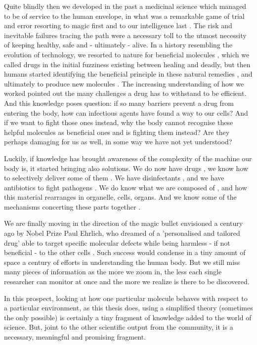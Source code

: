 Quite blindly then we developed in the past a medicinal science which managed to be of service to the human envelope, in what was a remarkable game of trial and error resorting to magic first and to our intelligence last \cite{history_medicine_review}. The risk and inevitable failures tracing the path were a necessary toll to the utmost necessity of keeping healthy, safe and - ultimately - alive. In a history resembling the evolution of technology, we resorted to nature for beneficial molecules \cite{above}, which we called drugs in the initial fuzziness existing between healing and deadly, but then humans started identifying the beneficial principle in these natural remedies \cite{other_review_early_drugs?}, and ultimately to produce new molecules \cite{other_review_early_drugs?}. The increasing understanding of how we worked pointed out the many challenges a drug has to withstand to be efficient. And this knowledge poses question: if so many barriers prevent a drug from entering the body, how can infectious agents have found a way to our cells? And if we want to fight those ones instead, why the body cannot recognise these helpful molecules as beneficial ones and is fighting them instead? Are they perhaps damaging for us as well, in some way we have not yet understood?

Luckily, if knowledge has brought awareness of the complexity of the machine our body is, it started bringing also solutions. We do now have drugs \cite{drug_database}, we know how to selectively deliver some of them \cite{review_drug_delivery}. We have disinfectants \cite{WIDES_database}, and we have antibiotics to fight pathogens \cite{ABXdatabaseJhopkins}. We do know what we are composed of \cite{Mitchess1945}, and how this material rearranges in organelle, cells, organs. And we know some of the mechanisms concerting these parts together \cite{what?}.

We are finally moving in the direction of the magic bullet envisioned a century ago by Nobel Prize Paul Ehrlich, who dreamed of a 'personalised and tailored drug' able to target specific molecular defects while being harmless - if not beneficial - to the other cells \cite{Strebhardt2008}. Such success would condense in a tiny amount of space a century of efforts in understanding the human body. But we still miss many pieces of information as the more we zoom in, the less each single researcher can monitor at once and the more we realize is there to be discovered.

In this prospect, looking at how one particular molecule behaves with respect to a particular environment, as this thesis does, using a simplified theory (sometimes the only possible) is certainly a tiny fragment of knowledge added to the world of science. But, joint to the other scientific output from the community, it is a necessary, meaningful and promising fragment.

